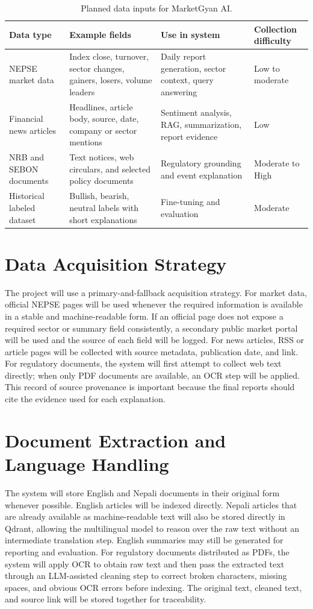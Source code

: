 \documentclass[12pt,a4paper]{report}
\begin{document}
\begin{table}[htbp]
\centering
\small
\begin{tabularx}{\textwidth}{|p{2.7cm}|Y|Y|p{2.1cm}|}
\hline
\textbf{Data type} & \textbf{Example fields} & \textbf{Use in system} & \textbf{Collection difficulty} \\
\hline
\ac{NEPSE} market data & Index close, turnover, sector changes, gainers, losers, volume leaders & Daily report generation, sector context, query answering & Low to moderate \\
\hline
Financial news articles & Headlines, article body, source, date, company or sector mentions & Sentiment analysis, \ac{RAG}, summarization, report evidence & Low \\
\hline
\ac{NRB} and \ac{SEBON} documents & Text notices, web circulars, and selected policy documents & Regulatory grounding and event explanation & Moderate to High \\
\hline
Historical labeled dataset & Bullish, bearish, neutral labels with short explanations & Fine-tuning and evaluation & Moderate \\
\hline
\end{tabularx}
\caption{Planned data inputs for MarketGyan AI.}
\label{tab:data}
\end{table}

\section{Data Acquisition Strategy}
The project will use a primary-and-fallback acquisition strategy. For market data, official \ac{NEPSE} pages will be used whenever the required information is available in a stable and machine-readable form. If an official page does not expose a required sector or summary field consistently, a secondary public market portal will be used and the source of each field will be logged. For news articles, \ac{RSS} or article pages will be collected with source metadata, publication date, and link. For regulatory documents, the system will first attempt to collect web text directly; when only PDF documents are available, an OCR step will be applied. This record of source provenance is important because the final reports should cite the evidence used for each explanation.

\section{Document Extraction and Language Handling}
The system will store English and Nepali documents in their original form whenever possible. English articles will be indexed directly. Nepali articles that are already available as machine-readable text will also be stored directly in Qdrant, allowing the multilingual model to reason over the raw text without an intermediate translation step. English summaries may still be generated for reporting and evaluation. For regulatory documents distributed as PDFs, the system will apply OCR to obtain raw text and then pass the extracted text through an \ac{LLM}-assisted cleaning step to correct broken characters, missing spaces, and obvious OCR errors before indexing. The original text, cleaned text, and source link will be stored together for traceability.
\end{document}
